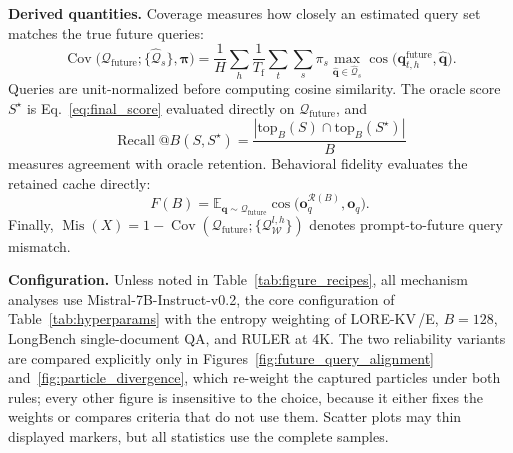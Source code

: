 \documentclass{article} %
\newcommand{\lorekvE}{LORE-KV\,/E}
\begin{document}
\textbf{Derived quantities.}
Coverage measures how closely an estimated query set matches the true future queries:
\begin{equation}
\operatorname{Cov}\big(\mathcal{Q}_{\mathrm{future}};
\{\hat{\mathcal{Q}}_s\},\boldsymbol{\pi}\big)
=
\frac{1}{H}\sum_h
\frac{1}{T_{\mathrm f}}\sum_t
\sum_s \pi_s
\max_{\hat{\mathbf q}\in\hat{\mathcal Q}_s}
\cos\!\big(
\mathbf q^{\mathrm{future}}_{t,h},
\hat{\mathbf q}
\big).
\label{eq:coverage}
\end{equation}
Queries are unit-normalized before computing cosine similarity. The oracle score $S^\star$ is Eq.~\eqref{eq:final_score} evaluated directly on $\mathcal{Q}_{\mathrm{future}}$, and
\begin{equation}
\operatorname{Recall}@B(S,S^\star)
=
\frac{
\left|\mathrm{top}_B(S)\cap\mathrm{top}_B(S^\star)\right|
}{B}
\label{eq:recall_at_b}
\end{equation}
measures agreement with oracle retention. Behavioral fidelity evaluates the retained cache directly:
\begin{equation}
F(B)
=
\mathbb{E}_{\mathbf q\sim\mathcal Q_{\mathrm{future}}}
\cos\!\big(
\mathbf o^{\mathcal R(B)}_q,
\mathbf o_q
\big).
\label{eq:fidelity}
\end{equation}
Finally,
$\operatorname{Mis}(X)=1-\operatorname{Cov}(\mathcal{Q}_{\mathrm{future}};
\{\mathcal Q_{\mathcal W}^{l,h}\})$
denotes prompt-to-future query mismatch.

\textbf{Configuration.}
Unless noted in Table~\ref{tab:figure_recipes}, all mechanism analyses use Mistral-7B-Instruct-v0.2, the core configuration of Table~\ref{tab:hyperparams} with the entropy weighting of \lorekvE, $B{=}128$, LongBench single-document QA, and RULER at $4$K. The two reliability variants are compared explicitly only in Figures~\ref{fig:future_query_alignment} and~\ref{fig:particle_divergence}, which re-weight the captured particles under both rules; every other figure is insensitive to the choice, because it either fixes the weights or compares criteria that do not use them. Scatter plots may thin displayed markers, but all statistics use the complete samples.
\end{document}
